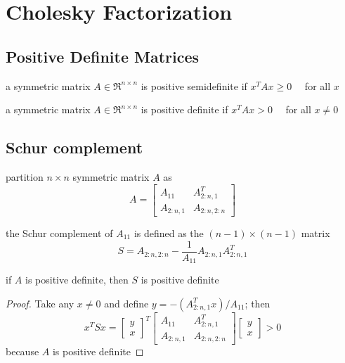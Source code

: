\chapter{Cholesky Factorization}

\section{Positive Definite Matrices}

\begin{definition}
    a symmetric matrix $ A \in \mathfrak{R}^{n \times n} $ is positive semidefinite if $ x^{T} A x \geq 0 \quad $ for all $ x $

\end{definition}

\begin{definition}
    a symmetric matrix $ A \in \mathfrak{R}^{n \times n} $ is positive definite if $ x^{T} A x>0 \quad $ for all $ x \neq 0 $
\end{definition}

\section{Schur complement}

\begin{definition}
    partition $ n \times n $ symmetric matrix $ A $ as
\begin{equation}
A=\left[\begin{array}{cc}
A_{11} & A_{2: n, 1}^{T} \\
A_{2: n, 1} & A_{2: n, 2: n}
\end{array}\right]
\end{equation}

the Schur complement of $ A_{11} $ is defined as the $ (n-1) \times(n-1) $ matrix
\begin{equation}
S=A_{2: n, 2: n}-\frac{1}{A_{11}} A_{2: n, 1} A_{2: n, 1}^{T}
\end{equation}
\end{definition}

\begin{theorem}
    if $ A $ is positive definite, then $ S $ is positive definite
\end{theorem}

\begin{proof}
    Take any $ x \neq 0 $ and define $ y=-\left(A_{2: n, 1}^{T} x\right) / A_{11} $; then
\begin{equation}
x^{T} S x=\left[\begin{array}{l}
y \\
x
\end{array}\right]^{T}\left[\begin{array}{cc}
A_{11} & A_{2: n, 1}^{T} \\
A_{2: n, 1} & A_{2: n, 2: n}
\end{array}\right]\left[\begin{array}{l}
y \\
x
\end{array}\right]>0
\end{equation}
because $ A $ is positive definite
\end{proof}

